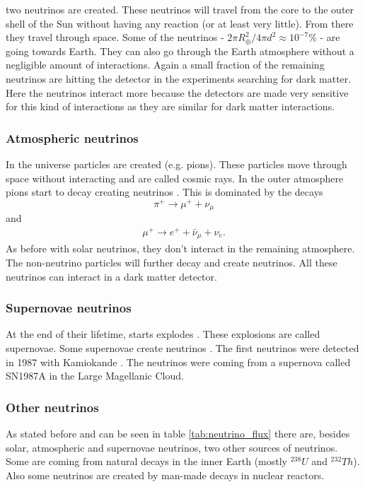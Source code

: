 \documentclass{article}
\begin{document}
two neutrinos are created. These neutrinos will travel from the core to the outer shell of the Sun without having any reaction (or at least very little). From there they travel through space. Some of the neutrinos - $2\pi R_\oplus^2 / 4\pi d^2 \approx 10^{-7}\%$ - are going towards Earth. They can also go through the Earth atmosphere without a negligible amount of interactions. Again a small fraction of the remaining neutrinos are hitting the detector in the experiments searching for dark matter. Here the neutrinos interact more because the detectors are made very sensitive for this kind of interactions as they are similar for dark matter interactions.


\subsubsection{Atmospheric neutrinos}
In the universe particles are created (e.g. pions). These particles move through space without interacting and are called cosmic rays. In the outer atmosphere pions start to decay creating neutrinos \cite{Fukuda:1998mi,Gaisser:2016obt}. This is dominated by the decays
\begin{equation}
    \pi^+\rightarrow\mu^++\nu_\mu
\end{equation}
and
\begin{align}
    \mu^+\rightarrow e^++\bar{\nu}_\mu+\nu_e.
\end{align}
As before with solar neutrinos, they don't interact in the remaining atmosphere. The non-neutrino particles will further decay and create neutrinos. All these neutrinos can interact in a dark matter detector.

\subsubsection{Supernovae neutrinos}
At the end of their lifetime, starts explodes \cite{raffelt1996stars}. These explosions are called supernovae. Some supernovae create neutrinos \cite{Beacom:2010kk}. The first neutrinos were detected in 1987 with Kamiokande \cite{Totsuka:1988iyh}. The neutrinos were coming from a supernova called SN1987A in the Large Magellanic Cloud.

\subsubsection{Other neutrinos}
As stated before and can be seen in table \ref{tab:neutrino_flux} there are, besides solar, atmospheric and supernovae neutrinos, two other sources of neutrinos. Some are coming from natural decays in the inner Earth (mostly ${}^{238}U$ and ${}^{232}Th$). Also some neutrinos are created by man-made decays in nuclear reactors.
\end{document}
